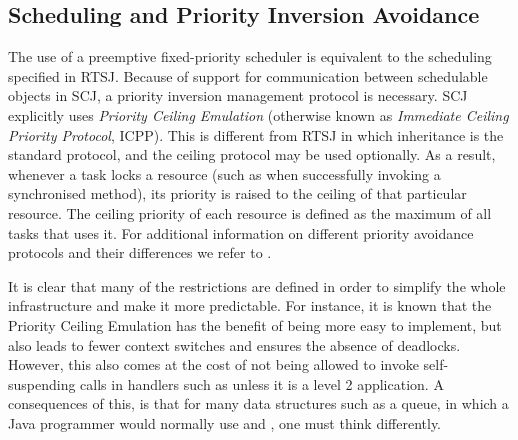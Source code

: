 \subsection{Scheduling and Priority Inversion Avoidance} %
\label{sub:scheduling_and_priority_inversion_avoidance}
The use of a preemptive fixed-priority scheduler is equivalent to the scheduling specified in RTSJ. Because of support for communication between schedulable objects in SCJ, a priority inversion management protocol is necessary. SCJ explicitly uses \textit{Priority Ceiling Emulation} (otherwise known as \textit{Immediate Ceiling Priority Protocol}, ICPP). This is different from RTSJ in which inheritance is the standard protocol, and the ceiling protocol may be used optionally. As a result, whenever a task locks a resource (such as when successfully invoking a synchronised method), its priority is raised to the ceiling of that particular resource. The ceiling priority of each resource is defined as the maximum of all tasks that uses it. For additional information on different priority avoidance protocols and their differences we refer to \cite{alan2001real}.

It is clear that many of the restrictions are defined in order to simplify the whole infrastructure and make it more predictable. For instance, it is known that the Priority Ceiling Emulation has the benefit of being more easy to implement, but also leads to fewer context switches and ensures the absence of deadlocks\cite{alan2001real}. However, this also comes at the cost of not being allowed to invoke self-suspending calls in handlers such as  unless it is a level 2 application. A consequences of this, is that for many data structures such as a queue, in which a Java programmer would normally use  and , one must think differently.


